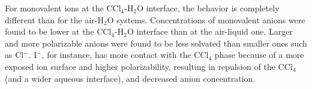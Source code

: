 For monovalent ions at the CCl$_4$-H$_2$O interface, the behavior is completely different than for the air-H$_2$O systems. Concentrations of monovalent anions were found to be lower at the CCl$_4$-H$_2$O interface than at the air-liquid one.\cite{Wick2007a} Larger and more polarizable anions were found to be less solvated than smaller ones such as Cl$^-$. I$^-$, for instance, has more contact with the CCl$_4$ phase because of a more exposed ion surface and higher polarizability, resulting in repulsion of the CCl$_4$ (and a wider aqueous interface), and decreased anion concentration.
